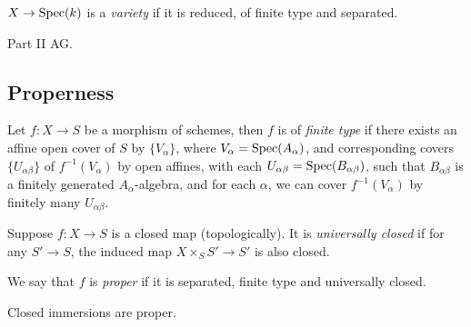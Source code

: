 \documentclass{article}
\begin{document}
\begin{definition}
    [variety]
    \(X \to \operatorname{Spec}(k)\) is a \emph{variety} if it is reduced, of finite type and separated.
\end{definition}

\begin{example}
    Part II AG.
\end{example}

\subsection{Properness}

\begin{definition}
    Let \(f : X \to S\) be a morphism of schemes, then \(f\) is of \emph{finite type} if there exists an affine open cover of \(S\) by \(\{V_\alpha\}\), where \(V_\alpha = \operatorname{Spec}(A_\alpha)\), and corresponding covers \(\{U_{\alpha\beta}\}\) of \(f^{-1}(V_\alpha)\) by open affines, with each \(U_{\alpha\beta} = \operatorname{Spec}(B_{\alpha\beta})\), such that \(B_{\alpha\beta}\) is a finitely generated \(A_\alpha\)-algebra, and for each \(\alpha\), we can cover \(f^{-1}(V_\alpha)\) by finitely many \(U_{\alpha\beta}\).
\end{definition}

\begin{definition}
    Suppose \(f : X \to S\) is a closed map (topologically). It is \emph{universally closed} if for any \(S' \to S\), the induced map \(X \times_S S' \to S'\) is also closed.
\end{definition}

\begin{definition}
    [proper] We say that \(f\) is \emph{proper} if it is separated, finite type and universally closed.
\end{definition}

\begin{example}
    Closed immersions are proper.
\end{example}
\end{document}
